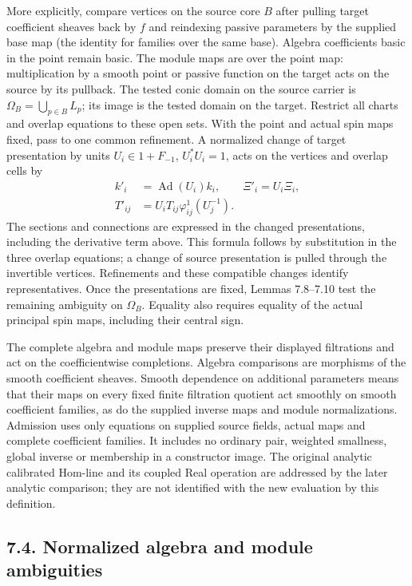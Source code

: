 \documentclass[
  english,
  11pt,
  reqno]{amsart}
\begin{document}
More explicitly, compare vertices on the source core \(B\) after pulling
target coefficient sheaves back by \(f\) and reindexing passive
parameters by the supplied base map (the identity for families over the
same base). Algebra coefficients basic in the point remain basic. The
module maps are over the point map: multiplication by a smooth point or
passive function on the target acts on the source by its pullback. The
tested conic domain on the source carrier is
\(\Omega_B=\bigcup_{p\in B}L_p\); its image is the tested domain on the
target. Restrict all charts and overlap equations to these open sets.
With the point and actual spin maps fixed, pass to one common
refinement. A normalized change of target presentation by units
\(U_i\in 1+F_{-1}\), \(U_i^*U_i=1\), acts on the vertices and overlap
cells by \[
\begin{aligned}
k'_i&=\operatorname{Ad}(U_i) k_i,\qquad \Xi'_i=U_i\Xi_i,\\
T'_{ij}&=U_iT_{ij}\varphi^1_{ij}(U_j^{-1}).
\end{aligned}
\] The sections and connections are expressed in the changed
presentations, including the derivative term above. This formula follows
by substitution in the three overlap equations; a change of source
presentation is pulled through the invertible vertices. Refinements and
these compatible changes identify representatives. Once the
presentations are fixed, Lemmas 7.8--7.10 test the remaining ambiguity
on \(\Omega_B\). Equality also requires equality of the actual principal
spin maps, including their central sign.

The complete algebra and module maps preserve their displayed
filtrations and act on the coefficientwise completions. Algebra
comparisons are morphisms of the smooth coefficient sheaves. Smooth
dependence on additional parameters means that their maps on every fixed
finite filtration quotient act smoothly on smooth coefficient families,
as do the supplied inverse maps and module normalizations. Admission
uses only equations on supplied source fields, actual maps and complete
coefficient families. It includes no ordinary pair, weighted smallness,
global inverse or membership in a constructor image. The original
analytic calibrated Hom-line and its coupled Real operation are
addressed by the later analytic comparison; they are not identified with
the new evaluation by this definition.

\subsection{7.4. Normalized algebra and module
ambiguities}\label{normalized-algebra-and-module-ambiguities}\label{sec:online-normalized-comparison-rigidity}
\end{document}
